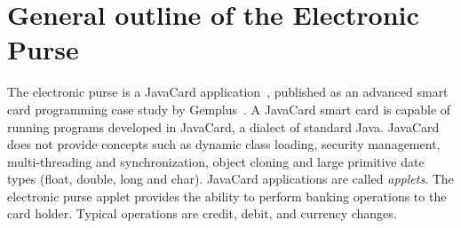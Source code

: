 \documentclass[a4paper]{llncs}
\begin{document}
\section{General outline of the Electronic Purse}
\label{SectGenPurse}

The electronic purse is a JavaCard application~\cite{JavaCardURL}, published
as an advanced smart card programming case study by
Gemplus~\cite{PurseUrl}. A JavaCard smart card is capable of running
programs developed in {JavaCard}, a dialect of
standard Java. {JavaCard} does not provide concepts such as dynamic
class loading, security management, multi-threading and
synchronization, object cloning and large primitive date types (float,
double, long and char).  JavaCard applications are called
\emph{applets}.  The electronic purse applet provides  the ability to 
perform banking operations to the card holder. Typical operations are
credit, debit, and currency changes.
\end{document}
